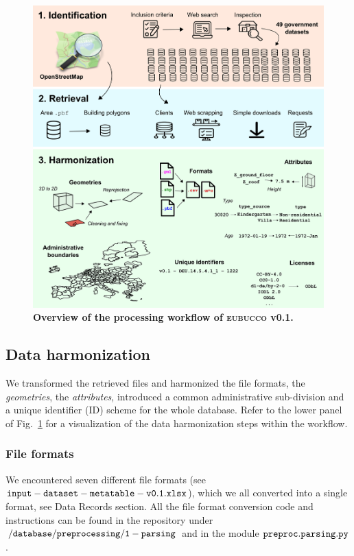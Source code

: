 \documentclass[fleqn,10pt]{wlscirep}
\begin{document}
\begin{figure}[h!]
\centering
\includegraphics[width=\linewidth]{figs/methods_no_valid.png}
\caption{\textbf{Overview of the processing workflow of \textsc{eubucco} v0.1.}}
\label{fig:methods}
\end{figure}

\subsection*{Data harmonization}

We transformed the retrieved files and harmonized the file formats, the \textit{geometries}, the \textit{attributes}, introduced a common administrative sub-division and a unique identifier (ID) scheme for the whole database.  Refer to the lower panel of Fig.~\ref{fig:methods} for a visualization of the data harmonization steps within the workflow.

\subsubsection*{File formats}

We encountered seven different file formats (see ${\tt input-dataset-metatable-v0.1.xlsx}$), which we all converted into a single format, see Data Records section. All the file format conversion code and instructions can be found in the repository under $\tt{/database/preprocessing/1-parsing}$ and in the module $\tt{preproc.parsing.py}$ \cite{eubucco-0.1-code2022}. 
\end{document}
